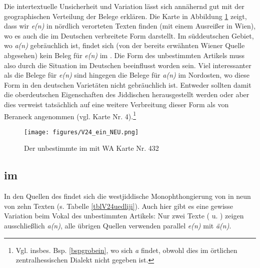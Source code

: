 Die intertextuelle Unsicherheit und Variation lässt sich annähernd gut mit der geographischen Verteilung der Belege erklären. Die Karte in Abbildung \ref{karteV24e} zeigt, dass wir \textit{e(n)}  in nördlich verorteten Texten finden (mit einem Ausreißer in Wien), wo es auch die im Deutschen verbreitete Form darstellt. Im süddeutschen Gebiet, wo \textit{a(n)}  gebräuchlich ist, findet sich (von der bereits erwähnten Wiener Quelle abgesehen) kein Beleg für \textit{e(n)} im . Die Form des unbestimmten Artikels muss also durch die Situation im Deutschen beeinflusst worden sein. Viel interessanter als die Belege für \textit{e(n)} sind hingegen die Belege für \textit{a(n)} im Nordosten, wo diese Form in den deutschen Varietäten nicht gebräuchlich ist. Entweder sollten damit die oberdeutschen Eigenschaften des Jiddischen herausgestellt werden oder aber dies verweist tatsächlich auf eine weitere Verbreitung dieser Form als von Beraneck angenommen (vgl.  Karte Nr. 4).\footnote{Vgl. insbes. Bsp. \ref{bspgrobein}, wo sich \textit{a}  findet, obwohl dies im örtlichen zentralhessischen Dialekt nicht gegeben ist.}\\

	\begin{figure}[h!]
		\centering
\texttt{[image: figures/V24\_ein\_NEU.png]}
		\caption{\label{karteV24e} Der unbestimmte  im  mit WA Karte Nr. 432}
		\end{figure}
 \FloatBarrier
 
 
  \subsection{ im }\label{liji2v24}
In den Quellen des  findet sich die westjiddische Monophthongierung von  in neun von zehn Texten (s. Tabelle \ref{tblV24uedliji}). Auch hier gibt es eine gewisse Variation beim Vokal des unbestimmten Artikels: Nur zwei Texte ( u. ) zeigen ausschließlich \textit{a(n)}, alle übrigen Quellen verwenden parallel \textit{e(n)} mit \textit{ä(n)}. 


